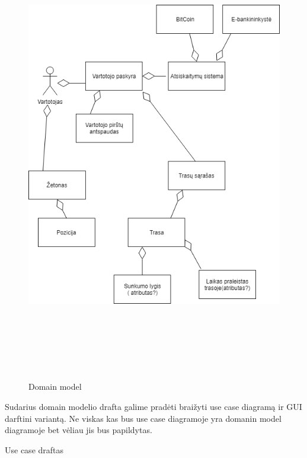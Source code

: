 \documentclass[oneside]{VUMIFPSkursinis}
\begin{document}
\begin{figure}[H]
		\centering	
	\includegraphics[width=18cm,height=20cm,keepaspectratio]{Domain2.png}
	\caption{Domain model}
	\label{fig:Domain model}
\end{figure}
Sudarius domain modelio drafta galime pradėti braižyti use case diagramą ir GUI darftini variantą. Ne viskas kas bus use case diagramoje yra domanin model diagramoje bet vėliau jis bus papildytas.



Use case draftas
\end{document}
